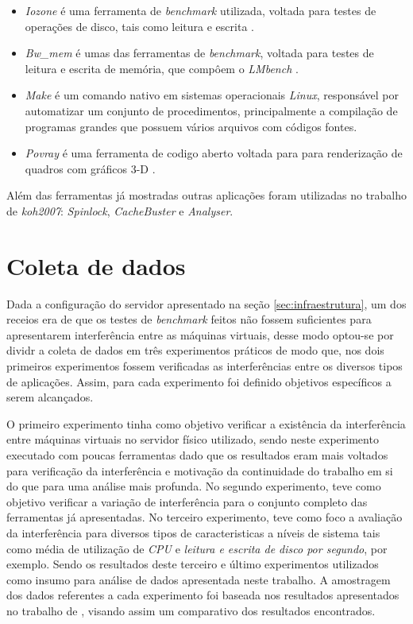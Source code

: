 \begin{itemize}
\item \textit{Iozone} é uma ferramenta de \textit{benchmark} utilizada, voltada para testes de operações de disco, tais como leitura e escrita \cite{iozone}.

\item \textit{Bw\_mem} é umas das ferramentas de \textit{benchmark}, voltada para testes de leitura e escrita de memória, que compôem o \textit{LMbench} \cite{lmbench}.

\item \textit{Make} é um comando nativo em sistemas operacionais \textit{Linux}, responsável por automatizar um conjunto de procedimentos, principalmente  a compilação de programas grandes que possuem vários arquivos com códigos fontes. 

\item \textit{Povray} é uma ferramenta de codigo aberto voltada para para renderização de quadros com gráficos 3-D \cite{povray}.

\end{itemize}

Além das ferramentas já mostradas outras aplicações foram utilizadas no trabalho de \textit{koh2007}: \textit{Spinlock}, \textit{CacheBuster} e \textit{Analyser}.

\section{Coleta de dados} 
Dada a configuração do servidor apresentado na seção \ref{sec:infraestrutura}, um dos receios era de que os testes de \textit{benchmark} feitos não fossem suficientes para apresentarem interferência entre as máquinas virtuais, desse modo optou-se por dividr a coleta de dados em três experimentos práticos de modo que, nos dois primeiros experimentos fossem verificadas as interferências entre os diversos tipos de aplicações. Assim, para cada experimento foi definido objetivos específicos a serem alcançados.

O primeiro experimento tinha como objetivo verificar a existência da interferência entre máquinas virtuais no servidor físico utilizado, sendo neste experimento executado com poucas ferramentas dado que os resultados eram mais voltados para verificação da interferência e motivação da continuidade do trabalho em si do que para uma análise mais profunda. No segundo experimento, teve como objetivo verificar a variação de interferência para o conjunto completo das ferramentas já apresentadas. No terceiro experimento, teve como foco a avaliação da interferência para diversos tipos de caracteristicas a níveis de sistema tais como média de utilização de \textit{CPU} e \textit{leitura e escrita de disco por segundo}, por exemplo. Sendo os resultados deste terceiro e último experimentos utilizados como insumo para análise de dados apresentada neste trabalho. A amostragem dos dados referentes a cada experimento foi baseada nos resultados apresentados no trabalho de , visando assim um comparativo dos resultados encontrados.

